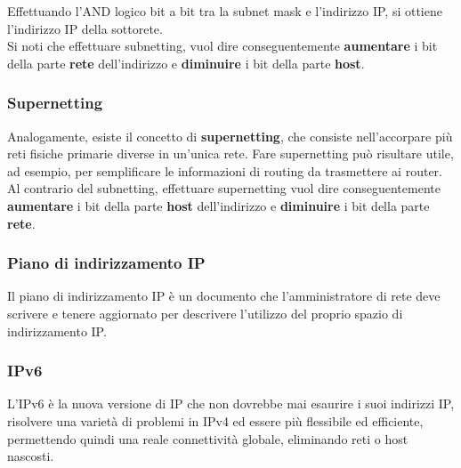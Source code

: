             Effettuando l'AND logico bit a bit tra la subnet mask e l'indirizzo IP, si ottiene l'indirizzo IP della
            sottorete.\\
            
            Si noti che effettuare subnetting, vuol dire conseguentemente \textbf{aumentare} i bit della parte \textbf{rete}
            dell’indirizzo e \textbf{diminuire} i bit della parte \textbf{host}.


            \subsubsection{Supernetting}
            Analogamente, esiste il concetto di \textbf{supernetting}, che consiste nell’accorpare più reti fisiche
            primarie diverse in un’unica rete. Fare supernetting può risultare utile, ad esempio, per
            semplificare le informazioni di routing da trasmettere ai router.\\

            Al contrario del subnetting, effettuare supernetting vuol dire conseguentemente \textbf{aumentare} i
            bit della parte \textbf{host} dell’indirizzo e \textbf{diminuire} i bit della parte \textbf{rete}.
            
            \subsubsection{Piano di indirizzamento IP}
            Il piano di indirizzamento IP è un documento che l’amministratore di rete deve scrivere e tenere
            aggiornato per descrivere l’utilizzo del proprio spazio di indirizzamento IP.
            
            \subsubsection{IPv6}
            L’IPv6 è la nuova versione di IP che non dovrebbe mai esaurire i suoi indirizzi IP, risolvere una
            varietà di problemi in IPv4 ed essere più flessibile ed efficiente, permettendo quindi una reale
            connettività globale, eliminando reti o host nascosti.\\
            
